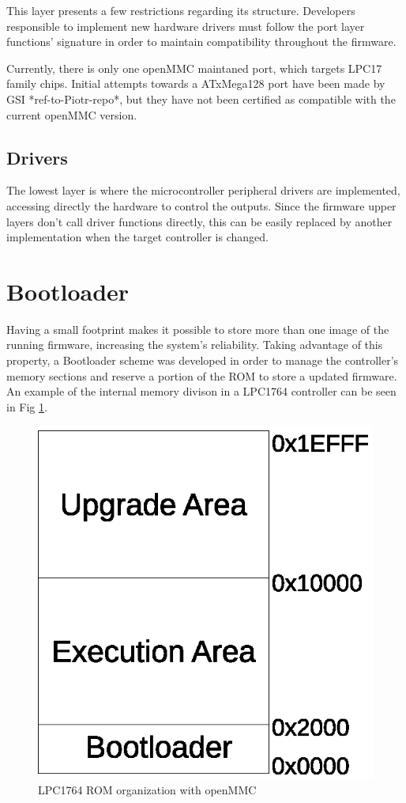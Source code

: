 \documentclass[a4paper,
              ]{jacow}
\begin{document}
This layer presents a few restrictions regarding its structure. Developers responsible to implement new hardware drivers must follow the port layer functions' signature in order to maintain compatibility throughout the firmware.

Currently, there is only one openMMC maintaned port, which targets LPC17 family chips.
Initial attempts towards a ATxMega128 port have been made by GSI *ref-to-Piotr-repo*, but they have not been certified as compatible with the current openMMC version.

\subsection{Drivers}
The lowest layer is where the microcontroller peripheral drivers are implemented, accessing directly the hardware to control the outputs.
Since the firmware upper layers don't call driver functions directly, this can be easily replaced by another implementation when the target controller is changed.

\section{Bootloader}
Having a small footprint makes it possible to store more than one image of the running firmware, increasing the system's reliability. Taking advantage of this property, a Bootloader scheme was developed in order to manage the controller's memory sections and reserve a portion of the ROM to store a updated firmware. An example of the internal memory divison in a LPC1764 controller can be seen in Fig \ref{fig:bootloader-mem}.

\begin{figure}[!htb]
\centering
\includegraphics[scale=0.6]{bootloader-mem.eps}
\caption{LPC1764 ROM organization with openMMC}
\label{fig:bootloader-mem}
\end{figure}
\end{document}
